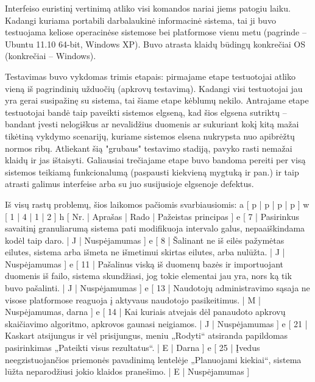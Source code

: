 Interfeiso euristinį vertinimą atliko visi komandos nariai jiems patogiu laiku.
Kadangi kuriama portabili darbalaukinė informacinė sistema, tai ji buvo testuojama
keliose operacinėse sistemose bei platformose vienu metu (pagrinde -- Ubuntu 11.10 64-bit,
Windows XP). Buvo atrasta klaidų būdingų konkrečiai OS (konkrečiai -- Windows).

Testavimas buvo vykdomas trimis etapais: pirmajame etape testuotojai atliko vieną iš
pagrindinių užduočių (apkrovų testavimą). Kadangi visi testuotojai jau yra gerai susipažinę
su sistema, tai šiame etape kėblumų nekilo. Antrajame etape testuotojai bandė taip paveikti
sistemos elgseną, kad šios elgsena sutriktų -- bandant įvesti nelogiškus ar nevalidžius duomenis
ar sukuriant kokį kitą mažai tikėtiną vykdymo scenarijų, kuriame sistemos elsena nukrypsta
nuo apibrėžtų normos ribų. Atliekant šią "grubaus" testavimo stadiją, pavyko rasti nemažai
klaidų ir jas ištaisyti. Galiausiai trečiajame etape buvo bandoma pereiti per visą sistemos
teikiamą funkcionalumą (paspausti kiekvieną mygtuką ir pan.) ir taip atrasti galimus
interfeise arba su juo susijusioje elgsenoje defektus.

Iš visų rastų problemų, šios laikomos pačiomis svarbiausiomis:
\xtableu
{
  a [ p | p | p | p ]
  w [ 1 | 4 | 1 | 2 ]
  h [ Nr. | Aprašas | Rado | Pažeistas principas ]
  e [  7  | Pasirinkus savaitinį granuliarumą sistema pati modifikuoja intervalo galus,
  nepaaiškindama kodėl taip daro. | J | Nuspėjamumas ]
  e [  8  | Šalinant ne iš eilės pažymėtas eilutes, sistema arba išmeta ne išmetimui
  skirtas eilutes, arba nulūžta.  | J | Nuspėjamumas ]
  e [ 11  | Pašalinus viską iš duomenų bazės ir importuojant duomenis iš failo,
  sistema skundžiasi, jog tokie elementai jau yra, nors ką tik buvo pašalinti. | J | Nuspėjamumas ]
  e [ 13  | Naudotojų administravimo sąsaja ne visose platformose reaguoja į
  aktyvaus naudotojo pasikeitimus. | M | Nuspėjamumas, darna ]
  e [ 14  | Kai kuriais atvejais dėl panaudoto apkrovų skaičiavimo algoritmo,
  apkrovos gaunasi neigiamos. | J | Nuspėjamumas ]
  e [ 21  | Kaskart atsijungus ir vėl prisijungus, meniu „Rodyti“ atsiranda papildomas
    pasirinkimas „Pateikti visus rezultatus“. | E | Darna ]
  e [ 25  | Įvedus neegzistuojančios priemonės pavadinimą lentelėje „Planuojami kiekiai“,
  sistema lūžta neparodžiusi jokio klaidos pranešimo. | E | Nuspėjamumas ]
}


